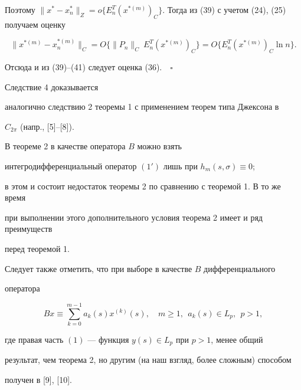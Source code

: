 Поэтому $\| x^* - x_n^* \|_{Z}=o \lbrace E_n^T(x^{*(m)})_{C}


\rbrace $. Тогда из (39) с учетом (24), (25) получаем оценку


$$


\| x^{*(m)} - x_n^{*(m)} \|_{C}=O \lbrace \| P_n \|_{C}


\ E_n^T(x^{*(m)})_{C} \rbrace=O \lbrace E_n^T(x^{*(m)})_{C} \ln n


\rbrace.


$$


Отсюда и из (39)--(41) следует оценка (36).$\quad\square$


\medskip





Следствие 4 доказывается


аналогично следствию 2 теоремы 1 с применением теорем типа Джексона в


$C_{2 \pi} $ (напр., [5]--[8]).





\begin{note}


В теореме 2 в качестве оператора $B$ можно взять


интегродифференциальный оператор $(1')$ лишь при $h_m(s, \sigma) \equiv 0$;


в этом и состоит недостаток теоремы 2 по сравнению с теоремой 1. В то же время


при выполнении этого дополнительного условия теорема 2 имеет и ряд преимуществ


перед теоремой 1.


\end{note}





Следует также отметить, что при выборе в качестве $B$ дифференциального


оператора


$$


Bx \equiv \sum_{k=0}^{m-1} a_k(s) x^{(k)}(s),


\quad m \geq 1,\ \ a_k(s) \in L_p,\ \ p >1,


$$


где правая часть $(1)$ --- функция $ y(s) \in L_p $ при $ p>1 $, менее общий


результат, чем теорема 2, но другим (на наш взгляд, более сложным) способом


получен в [9], [10].





